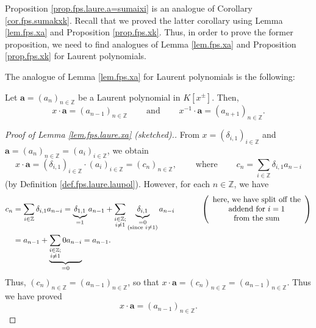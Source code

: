 \begin{fineprint}
Proposition \ref{prop.fps.laure.a=sumaixi} is an analogue of Corollary
\ref{cor.fps.sumakxk}. Recall that we proved the latter corollary using Lemma
\ref{lem.fps.xa} and Proposition \ref{prop.fps.xk}. Thus, in order to prove
the former proposition, we need to find analogues of Lemma \ref{lem.fps.xa}
and Proposition \ref{prop.fps.xk} for Laurent polynomials.

The analogue of Lemma \ref{lem.fps.xa} for Laurent polynomials is the following:

\begin{lemma}
\label{lem.fps.laure.xa}Let $\mathbf{a}=\left(  a_{n}\right)  _{n\in
\mathbb{Z}}$ be a Laurent polynomial in $K\left[  x^{\pm}\right]  $. Then,
\[
x\cdot\mathbf{a}=\left(  a_{n-1}\right)  _{n\in\mathbb{Z}}%
\ \ \ \ \ \ \ \ \ \ \text{and}\ \ \ \ \ \ \ \ \ \ x^{-1}\cdot\mathbf{a}%
=\left(  a_{n+1}\right)  _{n\in\mathbb{Z}}.
\]

\end{lemma}

\begin{proof}
[Proof of Lemma \ref{lem.fps.laure.xa} (sketched).]From $x=\left(
\delta_{i,1}\right)  _{i\in\mathbb{Z}}$ and $\mathbf{a}=\left(  a_{n}\right)
_{n\in\mathbb{Z}}=\left(  a_{i}\right)  _{i\in\mathbb{Z}}$, we obtain%
\[
x\cdot\mathbf{a}=\left(  \delta_{i,1}\right)  _{i\in\mathbb{Z}}\cdot\left(
a_{i}\right)  _{i\in\mathbb{Z}}=\left(  c_{n}\right)  _{n\in\mathbb{Z}%
},\ \ \ \ \ \ \ \ \ \ \text{where}\ \ \ \ \ \ \ \ \ \ c_{n}=\sum
_{i\in\mathbb{Z}}\delta_{i,1}a_{n-i}%
\]
(by Definition \ref{def.fps.laure.laupol}). However, for each $n\in\mathbb{Z}%
$, we have%
\begin{align*}
c_{n}  &  =\sum_{i\in\mathbb{Z}}\delta_{i,1}a_{n-i}=\underbrace{\delta_{1,1}%
}_{=1}a_{n-1}+\sum_{\substack{i\in\mathbb{Z};\\i\neq1}}\underbrace{\delta
_{i,1}}_{\substack{=0\\\text{(since }i\neq1\text{)}}}a_{n-i}%
\ \ \ \ \ \ \ \ \ \ \left(
\begin{array}
[c]{c}%
\text{here, we have split off the}\\
\text{addend for }i=1\\
\text{from the sum}%
\end{array}
\right) \\
&  =a_{n-1}+\underbrace{\sum_{\substack{i\in\mathbb{Z};\\i\neq1}}0a_{n-i}%
}_{=0}=a_{n-1}.
\end{align*}
Thus, $\left(  c_{n}\right)  _{n\in\mathbb{Z}}=\left(  a_{n-1}\right)
_{n\in\mathbb{Z}}$, so that $x\cdot\mathbf{a}=\left(  c_{n}\right)
_{n\in\mathbb{Z}}=\left(  a_{n-1}\right)  _{n\in\mathbb{Z}}$. Thus we have
proved%
\begin{equation}
x\cdot\mathbf{a}=\left(  a_{n-1}\right)  _{n\in\mathbb{Z}}.
\label{pf.lem.fps.laure.xa.1}%
\end{equation}



\end{proof}
\end{fineprint}
